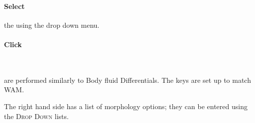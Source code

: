 \paragraph{Select} the  using the drop down menu.\\


\paragraph{Click} \\


 are performed similarly to Body fluid Differentials. The keys are set up to match WAM.

The right hand side has a list of morphology options; they can be entered using the \textsc{Drop Down} lists.

